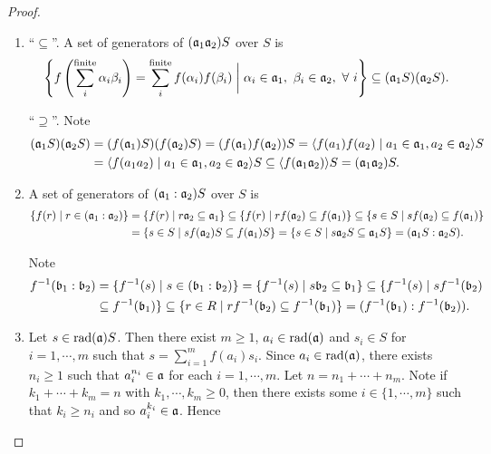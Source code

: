 \begin{proof}
\begin{enumerate}
        \item 
            ``$\subseteq$''. A set of generators of $(\mathfrak{a}_1\mathfrak{a}_2)S$ over $S$ is 
            \[\left\{f\left(\sum_i^{\text{finite}}\alpha_i\beta_i\right) = \sum_i^{\text{finite}} f(\alpha_i)f(\beta_i) \mathrel{\bigg |} \alpha_i \in \mathfrak{a}_1,\ \beta_i \in \mathfrak{a}_2, \ \forall \  i\right\} \subseteq (\mathfrak{a}_1S)(\mathfrak{a}_2S).\] 
            \par
            ``$\supseteq$''. Note 
            \begin{align*}
                (\mathfrak{a}_1S)(\mathfrak{a}_2S) &= (f(\mathfrak{a}_1)S)(f(\mathfrak{a}_2)S) = (f(\mathfrak{a}_1)f(\mathfrak{a}_2))S = \langle f(a_1)f(a_2) \mid a_1 \in \mathfrak{a}_1,a_2 \in \mathfrak{a}_2 \rangle S \\
                                   &= \langle f(a_1a_2) \mid a_1 \in \mathfrak{a}_1,a_2 \in \mathfrak{a}_2 \rangle S \subseteq \langle f(\mathfrak{a}_1\mathfrak{a}_2) \rangle S = (\mathfrak{a}_1\mathfrak{a}_2)S. 
            \end{align*}
        \item 
            A set of generators of $(\mathfrak{a}_1:\mathfrak{a}_2)S$ over $S$ is 
            \begin{align*}
                \{f(r) \mid r \in (\mathfrak{a}_1:\mathfrak{a}_2)\} &= \{f(r) \mid r \mathfrak{a}_2 \subseteq \mathfrak{a}_1\} \subseteq \{f(r) \mid r f(\mathfrak{a}_2) \subseteq f(\mathfrak{a}_1)\} \subseteq \{s \in S \mid sf(\mathfrak{a}_2) \subseteq f(\mathfrak{a}_1)\} \\
                                                    &= \{s \in S \mid s f(\mathfrak{a}_2)S \subseteq f(\mathfrak{a}_1)S \} = \{s \in S \mid s \mathfrak{a}_2 S \subseteq \mathfrak{a}_1 S\} = (\mathfrak{a}_1S:\mathfrak{a}_2S).
            \end{align*}
            \par Note 
            \begin{align*}
                f^{-1}(\mathfrak{b}_1:\mathfrak{b}_2) &= \{f^{-1}(s) \mid s \in (\mathfrak{b}_1:\mathfrak{b}_2)\} = \{f^{-1}(s) \mid s\mathfrak{b}_2 \subseteq \mathfrak{b}_1\} \subseteq \{f^{-1}(s) \mid sf^{-1}(\mathfrak{b}_2) \\
                                      &\subseteq f^{-1}(\mathfrak{b}_1)\} \subseteq \{r \in R\mid rf^{-1}(\mathfrak{b}_2) \subseteq f^{-1}(\mathfrak{b}_1)\} = (f^{-1}(\mathfrak{b}_1):f^{-1}(\mathfrak{b}_2)).
            \end{align*}
        \item 
            Let $s \in \operatorname{rad}(\mathfrak{a})S$. Then there exist $m \geq 1$, $a_i \in \operatorname{rad}(\mathfrak{a})$ and $s_i \in S$ for $i = 1,\cdots,m$ such that $s = \sum_{i=1}^m f(a_i)s_i$. Since $a_i \in \operatorname{rad}(\mathfrak{a})$, there exists $n_i \geq 1$ such that $a_i^{n_i} \in \mathfrak{a}$ for each $i = 1,\cdots,m$. Let $n = n_1 + \cdots + n_m$. Note if $k_1 + \cdots + k_m = n$ with $k_1,\cdots,k_m \geq 0$, then there exists some $i \in \{1,\cdots,m\}$ such that $k_i \geq n_i$ and so $a_i^{k_i} \in \mathfrak{a}$. Hence  

\end{enumerate}
\end{proof}
